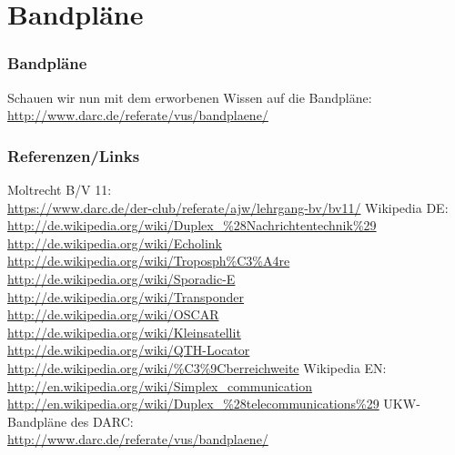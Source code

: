\section{Bandpläne}

\begin{frame}
  \frametitle{Bandpläne}

  Schauen wir nun mit dem erworbenen Wissen auf die Bandpläne: \\[2em]

  \url{http://www.darc.de/referate/vus/bandplaene/}

\end{frame}


\renewcommand{\refname}{Referenzen}

\begin{frame}
  \frametitle{Referenzen/Links}
  \hypertarget{refs}{}
  \footnotesize

  \begin{thebibliography}{}
     Moltrecht B/V 11: \\
      \url{https://www.darc.de/der-club/referate/ajw/lehrgang-bv/bv11/}
        Wikipedia DE: \\
      \url{http://de.wikipedia.org/wiki/Duplex_\%28Nachrichtentechnik\%29} \\
      \url{http://de.wikipedia.org/wiki/Echolink} \\
      \url{http://de.wikipedia.org/wiki/Troposph\%C3\%A4re} \\
      \url{http://de.wikipedia.org/wiki/Sporadic-E} \\
      \url{http://de.wikipedia.org/wiki/Transponder} \\
      \url{http://de.wikipedia.org/wiki/OSCAR} \\
      \url{http://de.wikipedia.org/wiki/Kleinsatellit} \\
      \url{http://de.wikipedia.org/wiki/QTH-Locator} \\
      \url{http://de.wikipedia.org/wiki/\%C3\%9Cberreichweite}
        Wikipedia EN: \\
      \url{http://en.wikipedia.org/wiki/Simplex_communication} \\
      \url{http://en.wikipedia.org/wiki/Duplex_\%28telecommunications\%29}
      UKW-Bandpläne des DARC: \\
      \url{http://www.darc.de/referate/vus/bandplaene/}
  \end{thebibliography}

\end{frame}


